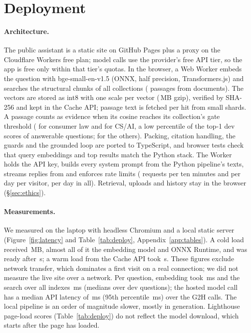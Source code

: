\section{Deployment}
\label{sec:deploy}

\paragraph{Architecture.}
The public assistant is a static site on GitHub Pages plus a proxy on the Cloudflare Workers free plan; model calls use the provider's free API tier, so the app is free only within that tier's quotas.
In the browser, a Web Worker embeds the question with bge-small-en-v1.5 (ONNX, half precision, Transformers.js) and searches the structural chunks of all  collections ( passages from  documents).
The vectors are stored as int8 with one scale per vector (\,MB gzip), verified by SHA-256 and kept in the Cache API; passage text is fetched per hit from small shards.
A passage counts as evidence when its cosine reaches its collection's gate threshold ( for consumer law and  for CS/AI, a low percentile of the top-1 dev scores of answerable questions;  for the others).
Packing, citation handling, the guards and the grounded loop are ported to TypeScript, and browser tests check that query embeddings and top results match the Python stack.
The Worker holds the API key, builds every system prompt from the Python pipeline's texts, streams replies from \mbox{} and enforces rate limits ( requests per ten minutes and  per day per visitor,  per day in all). Retrieval, uploads and history stay in the browser (\S\ref{sec:ethics}).

\paragraph{Measurements.}
We measured on the laptop with headless Chromium and a local static server (Figure~\ref{fig:latency} and Table~\ref{tab:deploy}, Appendix~\ref{app:tables}).
A cold load received \,MB, almost all of it the embedding model and ONNX Runtime, and was ready after \,s; a warm load from the Cache API took \,s. These figures exclude network transfer, which dominates a first visit on a real connection; we did not measure the live site over a network.
Per question, embedding took \,ms and the search over all indexes \,ms (medians over  dev questions); the hosted model call has a median API latency of \,ms (95th percentile \,ms) over the  G2H calls.
The local pipeline is an order of magnitude slower, mostly in generation.
Lighthouse page-load scores (Table~\ref{tab:deploy}) do not reflect the model download, which starts after the page has loaded.

